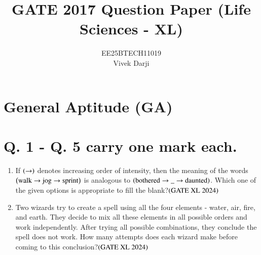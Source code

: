 \documentclass[journal]{IEEEtran}
\title{GATE 2017 Question Paper (Life Sciences - XL)}
\author{EE25BTECH11019 \\ Vivek Darji}
\date{}
\begin{document}
\maketitle
\section*{General Aptitude (GA)}
\section*{Q. 1 - Q. 5 carry one mark each.} 
\setcounter{enumi}{0}
\begin{enumerate}
    \item If $\left(\rightarrow\right)$ denotes increasing order of intensity, then the meaning of the words $\left(\text{walk} \rightarrow \text{jog} \rightarrow \text{sprint}\right)$ is analogous to $\left(\text{bothered} \rightarrow \_ \rightarrow \text{daunted}\right)$. Which one of the given options is appropriate to fill the blank?\hfill $\left(\text{GATE XL 2024}\right)$
    \begin{enumerate}
    \end{enumerate}

    \item Two wizards try to create a spell using all the four elements - water, air, fire, and earth. They decide to mix all these elements in all possible orders and work independently. After trying all possible combinations, they conclude the spell does not work. How many attempts does each wizard make before coming to this conclusion?\hfill $\left(\text{GATE XL 2024}\right)$
    \begin{enumerate}
    \end{enumerate}


\end{enumerate}
\end{document}
